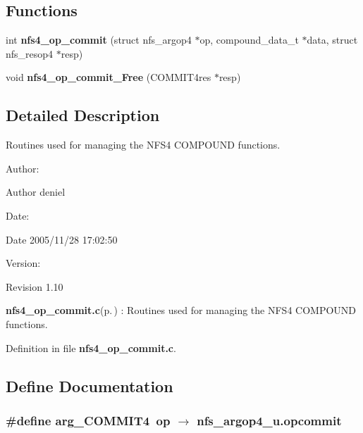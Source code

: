 \subsection*{Functions}
\begin{CompactItemize}
\item 
int {\bf nfs4\_\-op\_\-commit} (struct nfs\_\-argop4 $\ast$op, compound\_\-data\_\-t $\ast$data, struct nfs\_\-resop4 $\ast$resp)
\item 
void {\bf nfs4\_\-op\_\-commit\_\-Free} (COMMIT4res $\ast$resp)
\end{CompactItemize}


\subsection{Detailed Description}
Routines used for managing the NFS4 COMPOUND functions. 

\begin{Desc}
\item[Author:]\begin{Desc}
\item[Author]deniel \end{Desc}
\end{Desc}
\begin{Desc}
\item[Date:]\begin{Desc}
\item[Date]2005/11/28 17:02:50 \end{Desc}
\end{Desc}
\begin{Desc}
\item[Version:]\begin{Desc}
\item[Revision]1.10 \end{Desc}
\end{Desc}
{\bf nfs4\_\-op\_\-commit.c}{\rm (p.\,\pageref{nfs4__op__commit_8c})} : Routines used for managing the NFS4 COMPOUND functions.

Definition in file {\bf nfs4\_\-op\_\-commit.c}.

\subsection{Define Documentation}
\subsubsection{\setlength{\rightskip}{0pt plus 5cm}\#define arg\_\-COMMIT4\ op $\rightarrow$ nfs\_\-argop4\_\-u.opcommit}\label{nfs4__op__commit_8c_a0}



